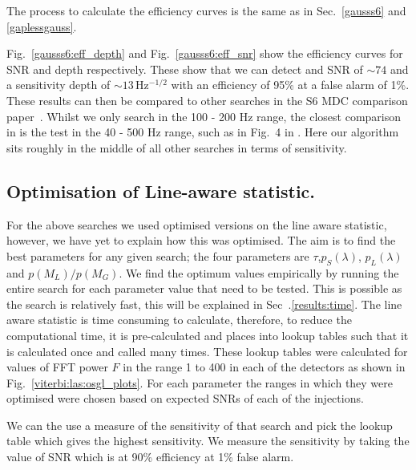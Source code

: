 %
%
The process to calculate the efficiency curves is the same as
in Sec.~\ref{gausss6} and \ref{gaplessgauss}.

%
%

Fig.~\ref{gausss6:eff_depth} and Fig.~\ref{gausss6:eff_snr} show the efficiency curves
for \ac{SNR} and depth respectively.  These show that we can detect and
\ac{SNR} of $\sim 74$ and a sensitivity depth of $\sim 13$\,Hz$^{-1/2}$ with
an efficiency of 95\% at a false alarm of 1\%. These results can then be compared to other searches in the S6 MDC comparison paper~\cite{Walsh2016}. Whilst we only search in the 100 - 200 Hz range, the closest comparison in \cite{Walsh2016} is the test in the 40 - 500 Hz range, such as in Fig.~4 in \cite{Walsh2016}. Here our algorithm sits roughly in the middle of all other searches in terms of sensitivity.

\subsection{\label{viterbi:las:optimisation}Optimisation of Line-aware statistic.}

For the above searches we used optimised versions on the line aware statistic, however, we have yet to explain how this was optimised. 
The aim is to find the best parameters for any given search; the four parameters are $\tau$,$p_S(\lambda)$, $p_L(\lambda)$ and $p(M_L)/p(M_G)$.
We find the optimum values empirically by running the entire search for each parameter value that need to be tested. This is possible as the search is relatively fast, this will be explained in Sec~.\ref{results:time}. 
The line aware statistic is time consuming to calculate, therefore, to reduce the computational time, it is pre-calculated and places into lookup tables such that it is calculated once and called many times. 
These lookup tables were calculated for values of \ac{FFT} power $F$ in the range 1 to 400 in each of the detectors as shown in Fig.~\ref{viterbi:las:osgl_plots}. For each parameter the ranges in which they were optimised were chosen based on expected \acp{SNR} of each of the injections. 

We can the use a measure of the sensitivity of that search and pick the lookup table which gives the highest sensitivity. 
We measure the sensitivity by taking the value of \ac{SNR} which is at 90\% efficiency at 1\% false alarm. 

